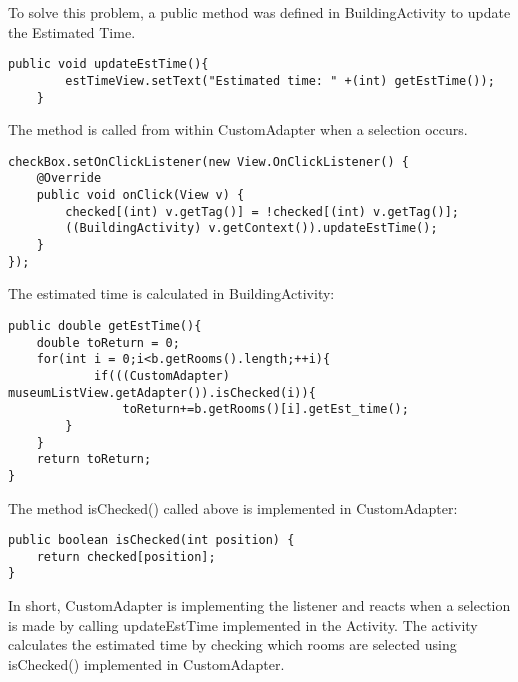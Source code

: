 To solve this problem, a public method was defined in BuildingActivity to update the Estimated Time.
\begin{lstlisting}
public void updateEstTime(){
        estTimeView.setText("Estimated time: " +(int) getEstTime());
    }
\end{lstlisting}
The method is called from within CustomAdapter when a selection occurs.
\begin{lstlisting}
checkBox.setOnClickListener(new View.OnClickListener() {
	@Override
    public void onClick(View v) {
        checked[(int) v.getTag()] = !checked[(int) v.getTag()];
        ((BuildingActivity) v.getContext()).updateEstTime();
    }
});
\end{lstlisting}
The estimated time is calculated in BuildingActivity:
\begin{lstlisting}
public double getEstTime(){
	double toReturn = 0;
    for(int i = 0;i<b.getRooms().length;++i){
    		if(((CustomAdapter) museumListView.getAdapter()).isChecked(i)){
        		toReturn+=b.getRooms()[i].getEst_time();
        }
    }
    return toReturn;
}
\end{lstlisting}
The method isChecked() called above is implemented in CustomAdapter:
\begin{lstlisting}
public boolean isChecked(int position) {
	return checked[position];
}
\end{lstlisting}
In short, CustomAdapter is implementing the listener and reacts when a selection is made by calling updateEstTime implemented in the Activity. The activity calculates the estimated time by checking which rooms are selected using isChecked() implemented in CustomAdapter.


